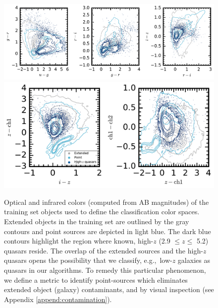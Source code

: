 \documentclass[apj, numberedappendix]{emulateapj}
\begin{document}
\begin{figure}[ht!]
  \centering
  \includegraphics[scale=0.7]{./New_Plots/opt_train_colors.pdf}
  \includegraphics[scale=0.7]{./New_Plots/ir_train_colors.pdf}
  \caption{\footnotesize{Optical and infrared colors (computed from AB magnitudes) of the training set objects used to define the classification color spaces. Extended objects in the training set are outlined by the gray contours and point sources are depicted in light blue. The dark blue contours highlight the region where known, high-$z$ (2.9 $\leq z \leq$ 5.2) quasars reside. The overlap of the extended sources and the high-$z$ quasars opens the possibility that we classify, e.g.,\ low-$z$ galaxies as quasars in our algorithms. To remedy this particular phenomenon, we define a metric to identify point-sources which eliminates extended object (galaxy) contaminants, and by visual inspection (see Appendix \ref{append:contamination}).}}
  \label{fig:traincol}
\end{figure}
\end{document}
